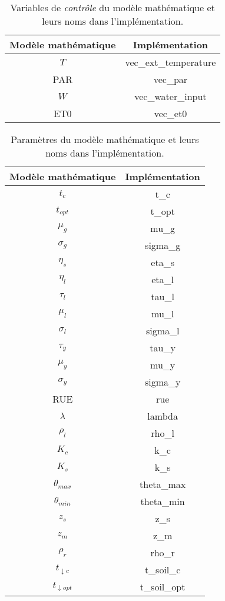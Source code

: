 \begin{table}[H]
  \centering
  \begin{tabular}{|c|c|}
    \hline
    \textbf{Modèle mathématique} & \textbf{Implémentation} \\
    \hline
    $T$ & vec\_ext\_temperature \\
    PAR & vec\_par \\
    $W$ & vec\_water\_input \\
    ET0 & vec\_et0 \\
    \hline
    \end{tabular}
  \caption{Variables de \emph{contrôle} du modèle mathématique et leurs noms
  dans l'implémentation.}
  \label{table:control_var}
\end{table}

\begin{table}[H]
  \centering
  \begin{tabular}{|c|c|}
    \hline
    \textbf{Modèle mathématique} & \textbf{Implémentation} \\
    \hline
    $t_c$ & t\_c \\
    $t_{opt}$ & t\_opt \\
    $\mu_g$ & mu\_g \\
    $\sigma_g$ & sigma\_g \\
    $\eta_s$ & eta\_s \\
    $\eta_l$ & eta\_l \\
    $\tau_l$ & tau\_l \\
    $\mu_l$ & mu\_l \\
    $\sigma_l$ & sigma\_l \\
    $\tau_y$ & tau\_y \\
    $\mu_y$ & mu\_y \\
    $\sigma_y$ & sigma\_y \\
    RUE & rue \\
    $\lambda$ & lambda \\
    $\rho_l$ & rho\_l \\
    $K_c$ & k\_c \\
    $K_s$ & k\_s \\
    $\theta_{max}$ & theta\_max \\
    $\theta_{min}$ & theta\_min \\
    $z_s$ & z\_s \\
    $z_m$ & z\_m \\
    $\rho_r$ & rho\_r \\
    $t_{\downarrow c}$ & t\_soil\_c \\
    $t_{\downarrow opt}$ & t\_soil\_opt \\
    \hline
  \end{tabular}
  \caption{Paramètres du modèle mathématique et leurs noms
  dans l'implémentation.}
  \label{table:param_var}
\end{table}
  




